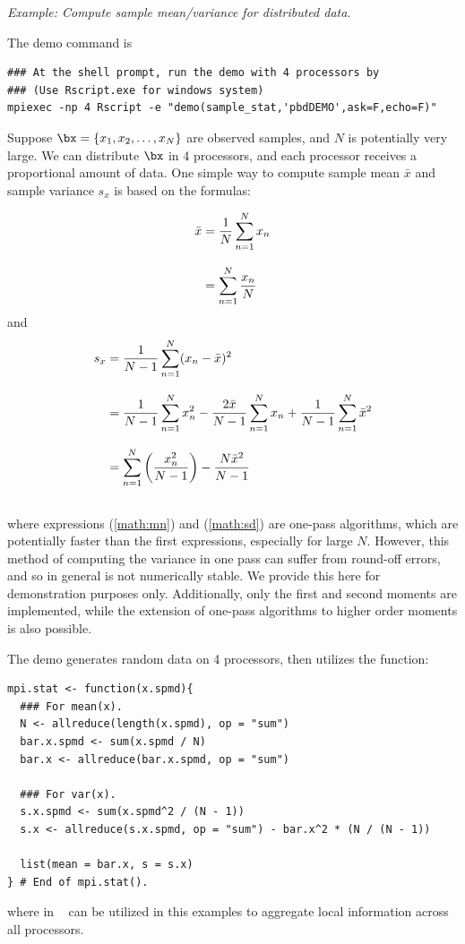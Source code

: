 \emph{Example:  Compute sample mean/variance for distributed data.}

The demo command is
\begin{lstlisting}
### At the shell prompt, run the demo with 4 processors by
### (Use Rscript.exe for windows system)
mpiexec -np 4 Rscript -e "demo(sample_stat,'pbdDEMO',ask=F,echo=F)"
\end{lstlisting}

Suppose $\bx = \{x_1, x_2, \ldots, x_N\}$
are observed samples, and $N$ is potentially very large.
We can distribute $\bx$ in 4 processors, and each processor receives a proportional amount of data. One simple way to compute sample mean $\bar{x}$ and
sample variance $s_x$ is based on the formulas:

\begin{align}
\bar{x} &= \frac{1}{N} \sum_{n = 1}^N x_n \notag \\[.3cm]
        &= \sum_{n = 1}^N \frac{x_n}{N} \label{math:mn}
\end{align}
and
\begin{align}
s_x     &= \frac{1}{N - 1} \sum_{n = 1}^N (x_n - \bar{x})^2 \notag \\[.3cm]
        &= \frac{1}{N - 1} \sum_{n = 1}^N x_n^2 - \frac{2\bar{x}}{N - 1}\sum_{n = 1}^N x_n +  \frac{1}{N - 1}\sum_{n = 1}^N\bar{x}^2 \notag \\[.3cm]
        &= \sum_{n = 1}^N \left(\frac{x^2_n}{N-1}\right) - \frac{N \bar{x}^2}{N-1} \label{math:sd}\\\notag
\end{align}
where expressions (\ref{math:mn}) and (\ref{math:sd}) are one-pass algorithms,
which are potentially faster than the first expressions,
especially for large $N$.  However, this method of computing the variance in one pass can suffer from round-off errors, and so in general is not numerically stable.  We provide this here for demonstration purposes only.  Additionally, only the first and second moments are implemented, while
the extension of one-pass algorithms to higher order moments is also
possible.

The demo generates random data on 4 processors, then
utilizes the  function:
\begin{lstlisting}[language=rr,title=R Code]
mpi.stat <- function(x.spmd){ 
  ### For mean(x).
  N <- allreduce(length(x.spmd), op = "sum")
  bar.x.spmd <- sum(x.spmd / N)
  bar.x <- allreduce(bar.x.spmd, op = "sum")

  ### For var(x).
  s.x.spmd <- sum(x.spmd^2 / (N - 1))
  s.x <- allreduce(s.x.spmd, op = "sum") - bar.x^2 * (N / (N - 1))

  list(mean = bar.x, s = s.x)
} # End of mpi.stat().
\end{lstlisting}
where  in ~\citep{Chen2012pbdMPIpackage} can
be utilized in this examples to aggregate local information across
all processors.






